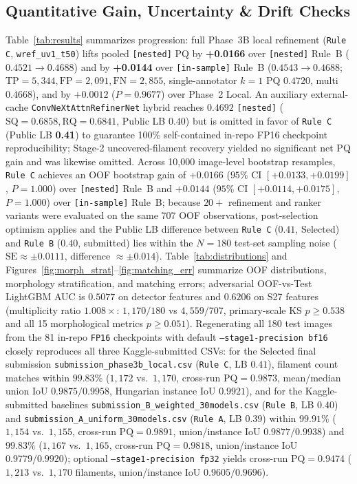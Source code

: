 \documentclass[sigconf]{acmart}
\begin{document}
    \subsection{Quantitative Gain, Uncertainty \& Drift Checks}
    Table~\ref{tab:results} summarizes progression: full Phase~3B local refinement (\texttt{Rule C}, \texttt{wref\_\allowbreak uv1\_t50}) lifts pooled \texttt{[nested]} PQ by \textbf{+0.0166} over \texttt{[nested]} Rule~B ($0.4521 \rightarrow 0.4688$) and by \textbf{+0.0144} over \texttt{[in-sample]} Rule~B ($0.4543 \rightarrow 0.4688$; $\text{TP}=5{,}344, \text{FP}=2{,}091, \text{FN}=2{,}855$, single-annotator $k=1$ PQ $0.4720$, multi $0.4668$), and by $+0.0012$ ($P=0.9677$) over Phase~2 Local. An auxiliary external-cache \texttt{ConvNeXt\allowbreak AttnRefinerNet} hybrid reaches $0.4692$ \texttt{[nested]} ($\text{SQ}=0.6858, \text{RQ}=0.6841$, Public LB $0.40$) but is omitted in favor of \texttt{Rule C} (Public LB \textbf{0.41}) to guarantee 100\% self-contained in-repo FP16 checkpoint reproducibility; Stage-2 uncovered-filament recovery yielded no significant net PQ gain and was likewise omitted. Across 10,000 image-level bootstrap resamples, \texttt{Rule C} achieves an OOF bootstrap gain of $+0.0166$ ($95\%$ CI $[+0.0133, +0.0199]$, $P=1.000$) over \texttt{[nested]} Rule~B and $+0.0144$ ($95\%$ CI $[+0.0114, +0.0175]$, $P=1.000$) over \texttt{[in-sample]} Rule~B; because $20+$ refinement and ranker variants were evaluated on the same 707 OOF observations, post-selection optimism applies and the Public LB difference between \texttt{Rule C} ($0.41$, Selected) and \texttt{Rule B} ($0.40$, submitted) lies within the $N=180$ test-set sampling noise ($\text{SE} \approx \pm 0.0111$, difference $\approx \pm 0.014$). Table~\ref{tab:distributions} and Figures~\ref{fig:morph_strat}--\ref{fig:matching_err} summarize OOF distributions, morphology stratification, and matching errors; adversarial OOF-vs-Test LightGBM AUC is $0.5077$ on detector features and $0.6206$ on S27 features (multiplicity ratio $1.008\times$: $1{,}170/180$ vs $4{,}559/707$, primary-scale KS $p \ge 0.538$ and all 15 morphological metrics $p \ge 0.051$). Regenerating all 180 test images from the 81 in-repo \texttt{FP16} checkpoints with default \texttt{--stage1-precision bf16} closely reproduces all three Kaggle-submitted CSVs: for the Selected final submission \texttt{submission\_phase3b\_local.csv} (\texttt{Rule C}, LB $0.41$), filament count matches within $99.83\%$ ($1{,}172$ vs.\ $1{,}170$, cross-run $\text{PQ}=\mathbf{0.9873}$, mean/median union IoU $\mathbf{0.9875}/\mathbf{0.9958}$, Hungarian instance IoU $\mathbf{0.9921}$), and for the Kaggle-submitted baselines \texttt{submission\_B\_weighted\_30models.csv} (\texttt{Rule B}, LB $0.40$) and \texttt{submission\_A\_uniform\_30models.csv} (\texttt{Rule A}, LB $0.39$) within $99.91\%$ ($1{,}154$ vs.\ $1{,}155$, cross-run $\text{PQ}=\mathbf{0.9891}$, union/instance IoU $\mathbf{0.9877}/\mathbf{0.9938}$) and $99.83\%$ ($1{,}167$ vs.\ $1{,}165$, cross-run $\text{PQ}=0.9818$, union/instance IoU $0.9779/0.9920$); optional \texttt{--stage1-precision fp32} yields cross-run $\text{PQ}=0.9474$ ($1{,}213$ vs.\ $1{,}170$ filaments, union/instance IoU $0.9605/0.9696$).
\end{document}
